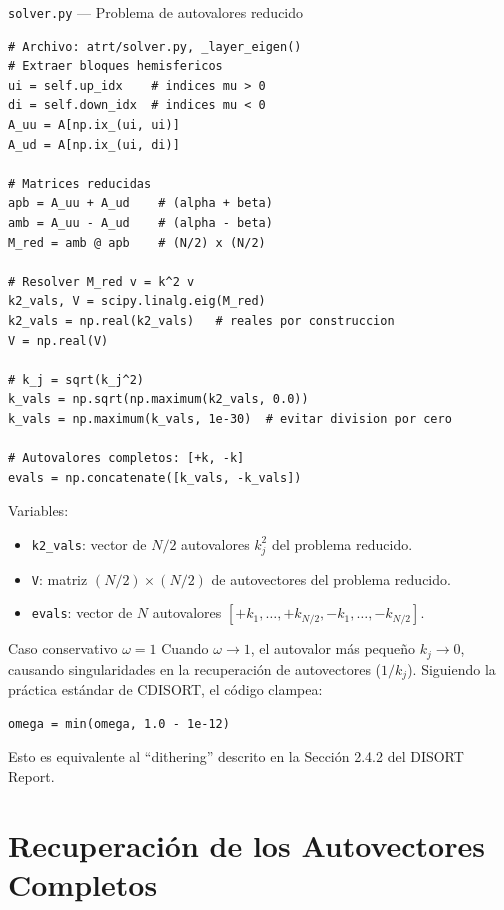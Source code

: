 \documentclass[a4paper,11pt]{article}
\begin{document}
\begin{implementation}{\texttt{solver.py} --- Problema de autovalores reducido}
\begin{lstlisting}
# Archivo: atrt/solver.py, _layer_eigen()
# Extraer bloques hemisfericos
ui = self.up_idx    # indices mu > 0
di = self.down_idx  # indices mu < 0
A_uu = A[np.ix_(ui, ui)]
A_ud = A[np.ix_(ui, di)]

# Matrices reducidas
apb = A_uu + A_ud    # (alpha + beta)
amb = A_uu - A_ud    # (alpha - beta)
M_red = amb @ apb    # (N/2) x (N/2)

# Resolver M_red v = k^2 v
k2_vals, V = scipy.linalg.eig(M_red)
k2_vals = np.real(k2_vals)   # reales por construccion
V = np.real(V)

# k_j = sqrt(k_j^2)
k_vals = np.sqrt(np.maximum(k2_vals, 0.0))
k_vals = np.maximum(k_vals, 1e-30)  # evitar division por cero

# Autovalores completos: [+k, -k]
evals = np.concatenate([k_vals, -k_vals])
\end{lstlisting}
Variables:
\begin{itemize}
\item \texttt{k2\_vals}: vector de $N/2$ autovalores $k_j^2$ del problema reducido.
\item \texttt{V}: matriz $(N/2) \times (N/2)$ de autovectores del problema reducido.
\item \texttt{evals}: vector de $N$ autovalores $[+k_1, \ldots, +k_{N/2}, -k_1, \ldots, -k_{N/2}]$.
\end{itemize}
\end{implementation}

\begin{concept}{Caso conservativo $\omega = 1$}
Cuando $\omega \to 1$, el autovalor m\'as peque\~no $k_j \to 0$, causando singularidades en la recuperaci\'on de autovectores ($1/k_j$). Siguiendo la pr\'actica est\'andar de CDISORT, el c\'odigo clampea:
\begin{lstlisting}
omega = min(omega, 1.0 - 1e-12)
\end{lstlisting}
Esto es equivalente al ``dithering'' descrito en la Secci\'on 2.4.2 del DISORT Report.
\end{concept}

\section{Recuperaci\'on de los Autovectores Completos}
\label{sec:eigenvectors}
\end{document}
